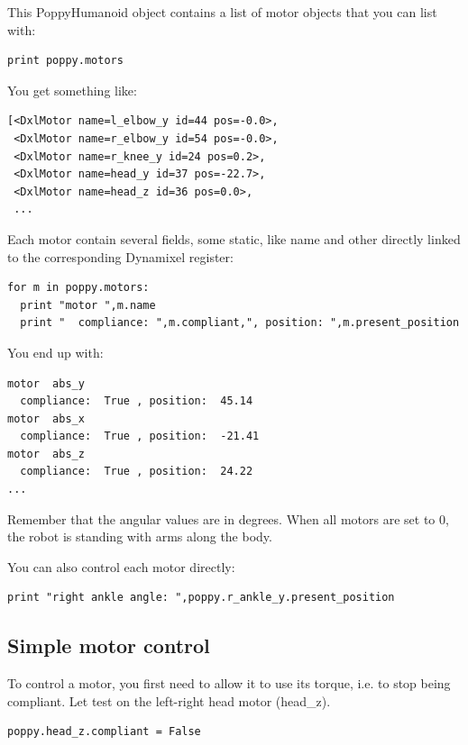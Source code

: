 \documentclass{article}
\begin{document}
This PoppyHumanoid object contains a list of motor objects that you can list with:

\begin{verbatim}
print poppy.motors
\end{verbatim}

You get something like:

\begin{verbatim}
[<DxlMotor name=l_elbow_y id=44 pos=-0.0>,
 <DxlMotor name=r_elbow_y id=54 pos=-0.0>,
 <DxlMotor name=r_knee_y id=24 pos=0.2>,
 <DxlMotor name=head_y id=37 pos=-22.7>,
 <DxlMotor name=head_z id=36 pos=0.0>,
 ...
\end{verbatim}

Each motor contain several fields, some static, like name and other directly linked to the corresponding Dynamixel register:

\begin{verbatim}
for m in poppy.motors:
  print "motor ",m.name
  print "  compliance: ",m.compliant,", position: ",m.present_position
\end{verbatim}

You end up with:

\begin{verbatim}
motor  abs_y
  compliance:  True , position:  45.14
motor  abs_x
  compliance:  True , position:  -21.41
motor  abs_z
  compliance:  True , position:  24.22
...
\end{verbatim}

Remember that the angular values are in degrees. When all motors are set to 0, the robot is standing with arms along the body.

You can also control each motor directly:

\begin{verbatim}
print "right ankle angle: ",poppy.r_ankle_y.present_position
\end{verbatim}

\subsection{Simple motor control}

To control a motor, you first need to allow it to use its torque, i.e. to stop being compliant. Let test on the left-right head motor (head\_z).

\begin{verbatim}
poppy.head_z.compliant = False
\end{verbatim}
\end{document}
